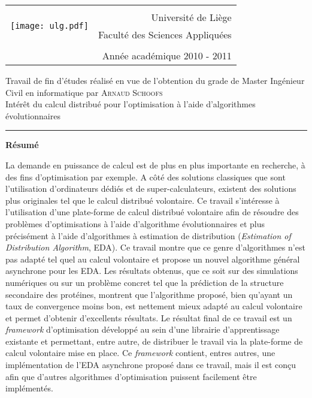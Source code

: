 \documentclass[a4paper, 12pt]{report}
\newcommand{\HRule}{\rule{\linewidth}{0.5mm}}
\begin{document}
\newpage


\thispagestyle{empty}


\begin{center}
\begin{tabular}{@{}lr}
\multirow{4}{*}{\texttt{[image: ulg.pdf]}} &    \\  
& Université de Liège  \\
& \hspace{6cm} Faculté des Sciences Appliquées  \\
& \\
& Année académique 2010 - 2011 \\
\hline
\end{tabular} 

\vspace{1.5 cm}

Travail de fin d'études réalisé en vue de l'obtention du grade de Master Ingénieur Civil en informatique par \textsc{Arnaud Schoofs}\\[2cm]

\huge Intérêt du calcul distribué pour l'optimisation à l'aide d'algorithmes évolutionnaires
\HRule


\vspace{1.5 cm}

\begin{large}\textbf{Résumé}\end{large}
\end{center}

La demande en puissance de calcul est de plus en plus importante en recherche, à des fins d'optimisation par exemple. A côté des solutions classiques que sont l'utilisation d'ordinateurs dédiés et de super-calculateurs, existent des solutions plus originales tel que le calcul distribué volontaire. Ce travail s'intéresse à l'utilisation d'une plate-forme de calcul distribué volontaire afin de résoudre des problèmes d'optimisations à l'aide d'algorithme évolutionnaires et plus précisément à l'aide d'algorithmes à estimation de distribution (\textit{Estimation of Distribution Algorithm}, EDA). Ce travail montre que ce genre d'algorithmes n'est pas adapté tel quel au calcul volontaire et propose un nouvel algorithme général asynchrone pour les EDA. Les résultats obtenus, que ce soit sur des simulations numériques ou sur un problème concret tel que la prédiction de la structure secondaire des protéines, montrent que l'algorithme proposé, bien qu'ayant un taux de convergence moins bon, est nettement mieux adapté au calcul volontaire et permet d'obtenir d'excellents résultats. Le résultat final de ce travail est un \textit{framework} d'optimisation développé au sein d'une librairie d'apprentissage existante et permettant, entre autre, de distribuer le travail via la plate-forme de calcul volontaire mise en place. Ce \textit{framework} contient, entres autres, une implémentation de l'EDA asynchrone proposé dans ce travail, mais il est conçu afin que d'autres algorithmes d'optimisation puissent facilement être implémentés.
\end{document}
